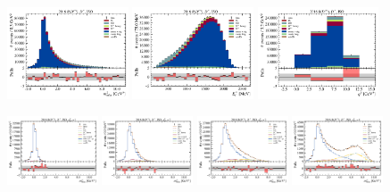 \begin{figure}[!htb]
    \centering
    \includegraphics[width=0.32\textwidth]{./figs-fit-fit-results/sig-fit/stacked/fit_result-stacked-Dst-iso-mmiss2.pdf}
    \includegraphics[width=0.32\textwidth]{./figs-fit-fit-results/sig-fit/stacked/fit_result-stacked-Dst-iso-el.pdf}
    \includegraphics[width=0.32\textwidth]{./figs-fit-fit-results/sig-fit/stacked/fit_result-stacked-Dst-iso-q2.pdf}

    \includegraphics[width=0.24\textwidth]{./figs-fit-fit-results/sig-fit/lines_q2_slices/fit_result-lines_q2_idx1-Dst-iso-mmiss2.pdf}
    \includegraphics[width=0.24\textwidth]{./figs-fit-fit-results/sig-fit/lines_q2_slices/fit_result-lines_q2_idx2-Dst-iso-mmiss2.pdf}
    \includegraphics[width=0.24\textwidth]{./figs-fit-fit-results/sig-fit/lines_q2_slices/fit_result-lines_q2_idx3-Dst-iso-mmiss2.pdf}
    \includegraphics[width=0.24\textwidth]{./figs-fit-fit-results/sig-fit/lines_q2_slices/fit_result-lines_q2_idx4-Dst-iso-mmiss2.pdf}


\end{figure}
